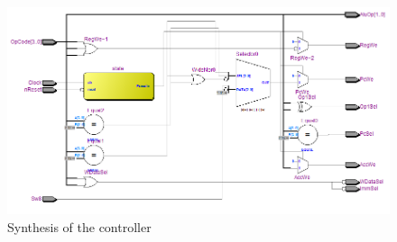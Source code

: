 \begin{figure}
\includegraphics[width=\textwidth]{Figures/controlsynth.png}
\caption{Synthesis of the controller}
\label{fig:control:synth}
\end{figure}


